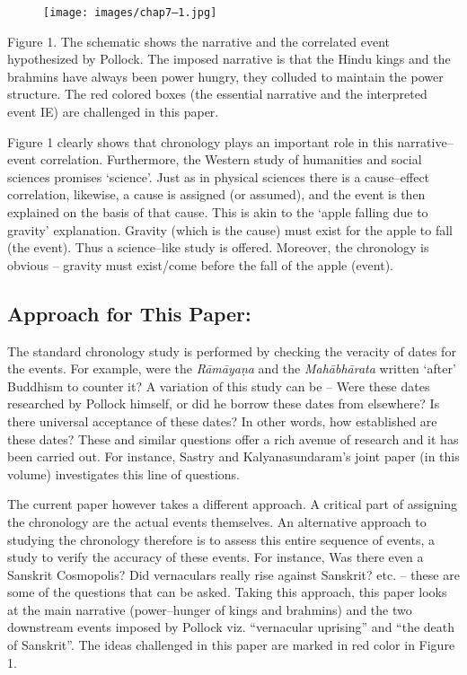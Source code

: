 \begin{figure}
\texttt{[image: images/chap7–1.jpg]}
\end{figure}

Figure 1. The schematic shows the narrative and the correlated event hypothesized by Pollock. The imposed narrative is that the Hindu kings and the brahmins have always been power hungry, they colluded to maintain the power structure. The red colored boxes (the essential narrative and the interpreted event {IE}) are challenged in this paper.

Figure 1 clearly shows that chronology plays an important role in this narrative–event correlation. Furthermore, the Western study of humanities and social sciences promises ‘science’. Just as in physical sciences there is a cause–effect correlation, likewise, a cause is assigned (or assumed), and the event is then explained on the basis of that cause. This is akin to the ‘apple falling due to gravity’ explanation. Gravity (which is the cause) must exist for the apple to fall (the event). Thus a science–like study is offered. Moreover, the chronology is obvious – gravity must exist/come before the fall of the apple (event).

\subsection*{Approach for This Paper:}

The standard chronology study is performed by checking the veracity of dates for the events. For example, were the \textit{Rāmāyaṇa} and the \textit{Mahābhārata} written ‘after’ Buddhism to counter it? A variation of this study can be – Were these dates researched by Pollock himself, or did he borrow these dates from elsewhere? Is there universal acceptance of these dates? In other words, how established are these dates? These and similar questions offer a rich avenue of research and it has been carried out. For instance, Sastry and Kalyanasundaram’s joint paper (in this volume) investigates this line of questions.

The current paper however takes a different approach. A critical part of assigning the chronology are the actual events themselves. An alternative approach to studying the chronology therefore is to assess this entire sequence of events, a study to verify the accuracy of these events. For instance, Was there even a Sanskrit Cosmopolis? Did vernaculars really rise against Sanskrit? etc. – these are some of the questions that can be asked. Taking this approach, this paper looks at the main narrative (power–hunger of kings and brahmins) and the two downstream events imposed by Pollock viz. “vernacular uprising” and “the death of Sanskrit”. The ideas challenged in this paper are marked in red color in Figure 1.


